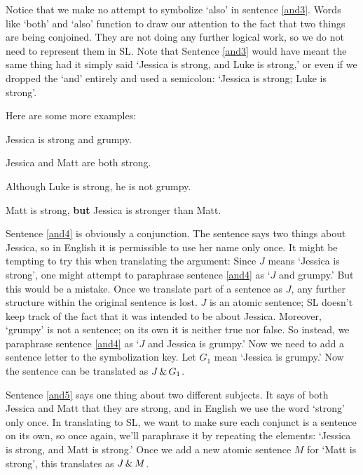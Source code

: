 Notice that we make no attempt to symbolize `also' in sentence \ref{and3}. Words like `both' and `also' function to draw our attention to the fact that two things are being conjoined. They are not doing any further logical work, so we do not need to represent them in SL. Note that Sentence \ref{and3} would have meant the same thing had it simply said `Jessica is strong, and Luke is strong,' or even if we dropped the `and' entirely and used a semicolon: `Jessica is strong; Luke is strong'. 

Here are some more examples:
\begin{earg}
\item[\ex{and4}]Jessica is strong and grumpy.
\item[\ex{and5}]Jessica and Matt are both strong.
\item[\ex{and6}]Although Luke is strong, he is not grumpy.
\item[\ex{and7}]Matt is strong, \textbf{but} Jessica is stronger than Matt.
\end{earg}

Sentence \ref{and4} is obviously a conjunction. The sentence says two things about Jessica, so in English it is permissible to use her name only once. It might be tempting to try this when translating the argument: Since $J$ means `Jessica is strong', one might attempt to paraphrase sentence \ref{and4} as `$J$ and grumpy.' But this would be a mistake. Once we translate part of a sentence as $J$, any further structure within the original sentence is lost. $J$ is an atomic sentence; SL doesn't keep track of the fact that it was intended to be about Jessica. Moreover, `grumpy' is not a sentence; on its own it is neither true nor false. So instead, we paraphrase sentence \ref{and4} as `$J$ and Jessica is grumpy.' Now we need to add a sentence letter to the symbolization key. Let $G_{1}$ mean `Jessica is grumpy.' Now the sentence can be translated as $J \,\&\, G_{1}$.


Sentence \ref{and5} says one thing about two different subjects. It says of both Jessica and Matt that they are strong, and in English we use the word `strong' only once. In translating to SL, we want to make sure each conjunct is a sentence on its own, so once again, we'll paraphrase it by repeating the elements: `Jessica is strong, and Matt is strong.' Once we add a new atomic sentence $M$ for `Matt is strong', this translates as $J\,\&\, M$.

